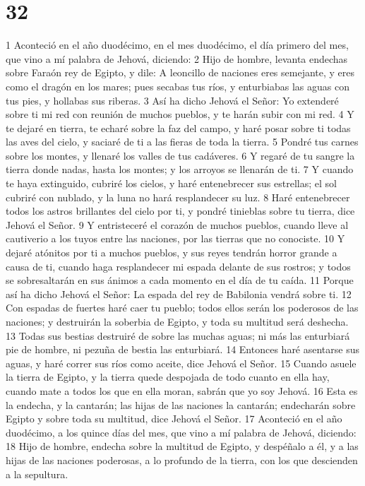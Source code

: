 \chapter{32}

1 Aconteció en el año duodécimo, en el mes duodécimo, el día primero del mes, que vino a mí palabra de Jehová, diciendo:
2 Hijo de hombre, levanta endechas sobre Faraón rey de Egipto, y dile: A leoncillo de naciones eres semejante, y eres como el dragón en los mares; pues secabas tus ríos, y enturbiabas las aguas con tus pies, y hollabas sus riberas.
3 Así ha dicho Jehová el Señor: Yo extenderé sobre ti mi red con reunión de muchos pueblos, y te harán subir con mi red.
4 Y te dejaré en tierra, te echaré sobre la faz del campo, y haré posar sobre ti todas las aves del cielo, y saciaré de ti a las fieras de toda la tierra.
5 Pondré tus carnes sobre los montes, y llenaré los valles de tus cadáveres.
6 Y regaré de tu sangre la tierra donde nadas, hasta los montes; y los arroyos se llenarán de ti.
7 Y cuando te haya extinguido, cubriré los cielos, y haré entenebrecer sus estrellas; el sol cubriré con nublado, y la luna no hará resplandecer su luz. 
8 Haré entenebrecer todos los astros brillantes del cielo por ti, y pondré tinieblas sobre tu tierra, dice Jehová el Señor.
9 Y entristeceré el corazón de muchos pueblos, cuando lleve al cautiverio a los tuyos entre las naciones, por las tierras que no conociste.
10 Y dejaré atónitos por ti a muchos pueblos, y sus reyes tendrán horror grande a causa de ti, cuando haga resplandecer mi espada delante de sus rostros; y todos se sobresaltarán en sus ánimos a cada momento en el día de tu caída.
11 Porque así ha dicho Jehová el Señor: La espada del rey de Babilonia vendrá sobre ti.
12 Con espadas de fuertes haré caer tu pueblo; todos ellos serán los poderosos de las naciones; y destruirán la soberbia de Egipto, y toda su multitud será deshecha.
13 Todas sus bestias destruiré de sobre las muchas aguas; ni más las enturbiará pie de hombre, ni pezuña de bestia las enturbiará.
14 Entonces haré asentarse sus aguas, y haré correr sus ríos como aceite, dice Jehová el Señor.
15 Cuando asuele la tierra de Egipto, y la tierra quede despojada de todo cuanto en ella hay, cuando mate a todos los que en ella moran, sabrán que yo soy Jehová.
16 Esta es la endecha, y la cantarán; las hijas de las naciones la cantarán; endecharán sobre Egipto y sobre toda su multitud, dice Jehová el Señor.
17 Aconteció en el año duodécimo, a los quince días del mes, que vino a mí palabra de Jehová, diciendo:
18 Hijo de hombre, endecha sobre la multitud de Egipto, y despéñalo a él, y a las hijas de las naciones poderosas, a lo profundo de la tierra, con los que descienden a la sepultura.
